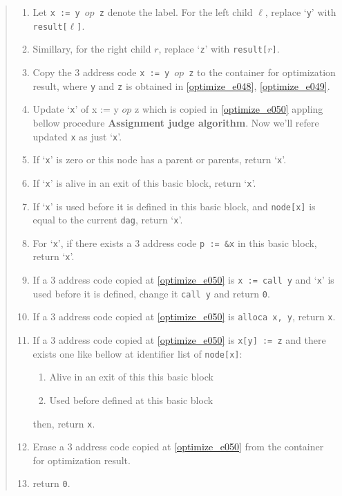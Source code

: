 \begin{quote}
\begin{enumerate}
\item \label{optimize_e048}
      Let {\tt{x := y $op$ z}} denote the label.
      For the left child $\ell$, replace `{\tt{y}}' with
      {\tt{result[$\ell$]}}.
\item \label{optimize_e049}
      Simillary, for the right child $r$, replace `{\tt{z}}'
      with {\tt{result[$r$]}}.
\item \label{optimize_e050}
      Copy the 3 address code {\tt{x := y $op$ z}} to the container
      for optimization result, where {\tt{y}} and {\tt{z}}
      is obtained in \ref{optimize_e048}, \ref{optimize_e049}.
\item Update `{\tt{x}}' of {x := y $op$ z} which is copied in
      \ref{optimize_e050} appling bellow procedure
      {\bf Assignment judge algorithm}. Now we'll refere updated
       {\tt{x}} as just `{\tt{x}}'.
\item  If `{\tt{x}}' is zero or this node has a parent or parents,
       return `{\tt{x}}'.
\item If `{\tt{x}}' is alive in an exit of this basic block,
      return `{\tt{x}}'.
\item If `{\tt{x}}' is used before it is defined
      in this basic block, and {\tt{node[x]}} is equal to
      the current {\tt{dag}}, return `{\tt{x}}'.
\item For `{\tt{x}}', if there exists a 3 address code {\tt{p := \&x}} in this
      basic block, return `{\tt{x}}'.
\item \label{optimize_e057}
      If a 3 address code copied at \ref{optimize_e050} is
      {\tt{x := call y}} and `{\tt{x}}' is used before it is
      defined, change it {\tt{call y}} and return {\tt{0}}.
\item If a 3 address code copied at \ref{optimize_e050} is
      {\tt{alloca x, y}}, return {\tt{x}}.
\item If a 3 address code copied at \ref{optimize_e050} is
      {\tt{x[y] := z}} and there exists one like bellow
      at identifier list of {\tt{node[x]}}:
      \begin{enumerate}
      \item Alive in an exit of this this basic block
      \item Used before defined at this basic block
      \end{enumerate}
      then, return {\tt{x}}.
\item \label{optimize_e056}
      Erase a 3 address code copied at \ref{optimize_e050} 
      from the container for optimization result.
\item return {\tt{0}}.
\end{enumerate}
\end{quote}

